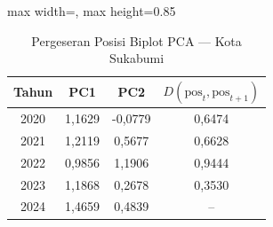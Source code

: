 \begin{table}[H]
\centering
\caption{Pergeseran Posisi Biplot PCA --- Kota Sukabumi} \label{tab:appjarak_pca_skor_kota_sukabumi}
\begin{adjustbox}{max width=\textwidth, max height=0.85\textheight}
\begin{tabular}{|c|c|c|c|}
\hline
\textbf{Tahun} & \textbf{PC1} & \textbf{PC2} & \textbf{$D(\text{pos}_t, \text{pos}_{t+1})$} \\
\hline
2020 & 1,1629 & -0,0779 & 0,6474 \\
2021 & 1,2119 & 0,5677 & 0,6628 \\
2022 & 0,9856 & 1,1906 & 0,9444 \\
2023 & 1,1868 & 0,2678 & 0,3530 \\
2024 & 1,4659 & 0,4839 & -- \\
\hline
\end{tabular}
\end{adjustbox}
\end{table}